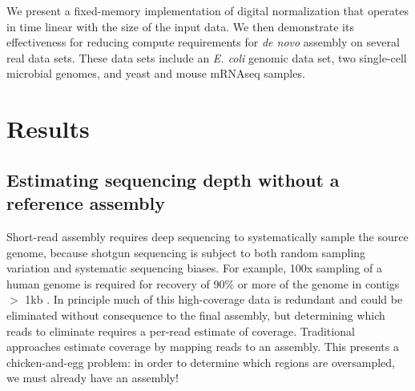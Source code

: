 \documentclass{pnastwo}
\begin{document}
\begin{article}


We present a fixed-memory implementation of digital normalization that
operates in time linear with the size of the input data.  We then
demonstrate its effectiveness for reducing compute requirements for
{\em de novo} assembly on several real data sets.  These data sets
include an {\em E. coli} genomic data set, two single-cell microbial
genomes, and yeast and mouse mRNAseq samples.

\section{Results}

\subsection*{Estimating sequencing depth without a reference assembly}

Short-read assembly requires deep sequencing to systematically sample
the source genome, because shotgun sequencing is subject to both
random sampling variation and systematic sequencing biases.  For
example, 100x sampling of a human genome is required for recovery of
90\% or more of the genome in contigs $>$ 1kb \cite{pubmed21187386}.
In principle much of this high-coverage data is redundant and could be
eliminated without consequence to the final assembly, but determining
which reads to eliminate requires a per-read estimate of coverage.
Traditional approaches estimate coverage by mapping reads to an
assembly.  This presents a chicken-and-egg problem: in order to
determine which regions are oversampled, we must already have an
assembly!


\end{article}
\end{document}
